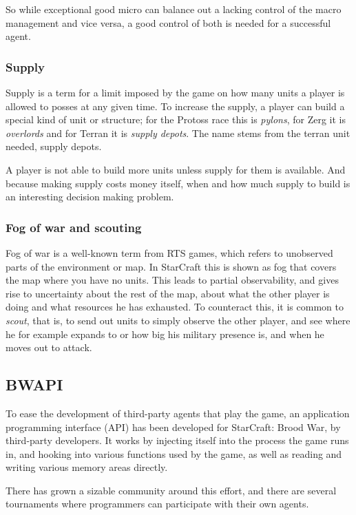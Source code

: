 So while exceptional good micro can balance out a lacking control of the macro management and vice versa, a good control of both is needed for a successful agent.

\subsubsection{Supply}
Supply is a term for a limit imposed by the game on how many units a player is allowed to posses at any given time. To increase the supply, a player can build a special kind of unit or structure; for the Protoss race this is {\em pylons}, for Zerg it is {\em overlords} and for Terran it is {\em supply depots}. The name stems from the terran unit needed, supply depots.

A player is not able to build more units unless supply for them is available. And because making supply costs money itself, when and how much supply to build is an interesting decision making problem.

\subsubsection{Fog of war and scouting}
Fog of war is a well-known term from RTS games, which refers to unobserved parts of the environment or map. In StarCraft this is shown as fog that covers the map where you have no units. This leads to partial observability, and gives rise to uncertainty about the rest of the map, about what the other player is doing and what resources he has exhausted. To counteract this, it is common to {\em scout}, that is, to send out units to simply observe the other player, and see where he for example expands to or how big his military presence is, and when he moves out to attack.

\subsection{BWAPI}
To ease the development of third-party agents that play the game, an application programming interface (API) has been developed for StarCraft: Brood War, by third-party developers. It works by injecting itself into the process the game runs in, and hooking into various functions used by the game, as well as reading and writing various memory areas directly.\cite{bwapi}

There has grown a sizable community around this effort, and there are several tournaments where programmers can participate with their own agents.\cite{bwapi}\cite{sscait}

